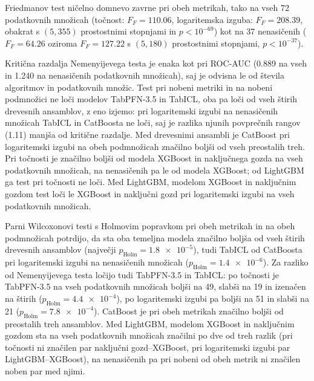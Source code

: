 \documentclass[a4paper,12pt,openright]{book}
\begin{document}


Friedmanov test ničelno domnevo zavrne pri obeh metrikah, tako na vseh 72
podatkovnih množicah (točnost: $F_F = \num{110.06}$, logaritemska izguba: $F_F =
\num{208.39}$, obakrat s $(5, 355)$ prostostnimi stopnjami in $p < 10^{-69}$) kot
na 37 nenasičenih ($F_F = \num{64.26}$ oziroma $F_F = \num{127.22}$ s $(5, 180)$
prostostnimi stopnjami, $p < 10^{-37}$).

Kritična razdalja Nemenyijevega testa je enaka kot pri ROC-AUC (\num{0.889} na
vseh in \num{1.240} na nenasičenih podatkovnih množicah), saj je odvisna le od
števila algoritmov in podatkovnih množic. Test pri nobeni metriki in na nobeni
podmnožici ne loči modelov TabPFN-3.5 in TabICL, oba pa loči od vseh štirih
drevesnih ansamblov, z eno izjemo: pri logaritemski izgubi na nenasičenih
množicah TabICL in CatBoosta ne loči, saj je razlika njunih povprečnih rangov
(\num{1.11}) manjša od kritične razdalje. Med drevesnimi ansambli je CatBoost
pri logaritemski izgubi na obeh podmnožicah značilno boljši od vseh preostalih
treh. Pri točnosti je značilno boljši od modela XGBoost in naključnega gozda na
vseh podatkovnih množicah, na nenasičenih pa le od modela XGBoost; od LightGBM
ga test pri točnosti ne loči. Med
LightGBM, modelom XGBoost in naključnim gozdom test loči le XGBoost in naključni
gozd pri logaritemski izgubi na vseh podatkovnih množicah.

Parni Wilcoxonovi testi s Holmovim popravkom pri obeh metrikah in na obeh
podmnožicah potrdijo, da sta oba temeljna modela značilno boljša od vseh štirih
drevesnih ansamblov (največji $p_\mathrm{Holm} = \num{1.8e-5}$), tudi TabICL od
CatBoosta pri logaritemski izgubi na nenasičenih množicah
($p_\mathrm{Holm} = \num{1.4e-6}$). Za razliko od Nemenyijevega testa ločijo tudi
TabPFN-3.5 in TabICL: po točnosti je TabPFN-3.5 na vseh podatkovnih množicah
boljši na 49, slabši na 19 in izenačen na štirih
($p_\mathrm{Holm} = \num{4.4e-4}$), po logaritemski izgubi pa boljši na 51 in
slabši na 21 ($p_\mathrm{Holm} = \num{7.8e-4}$). CatBoost je pri obeh metrikah
značilno boljši od preostalih treh ansamblov. Med LightGBM, modelom XGBoost in
naključnim gozdom sta na vseh podatkovnih množicah značilni po dve od treh
razlik (pri točnosti ni značilen par naključni gozd--XGBoost, pri logaritemski
izgubi par LightGBM--XGBoost), na nenasičenih pa pri nobeni od obeh metrik ni
značilen noben par med njimi.
\end{document}
